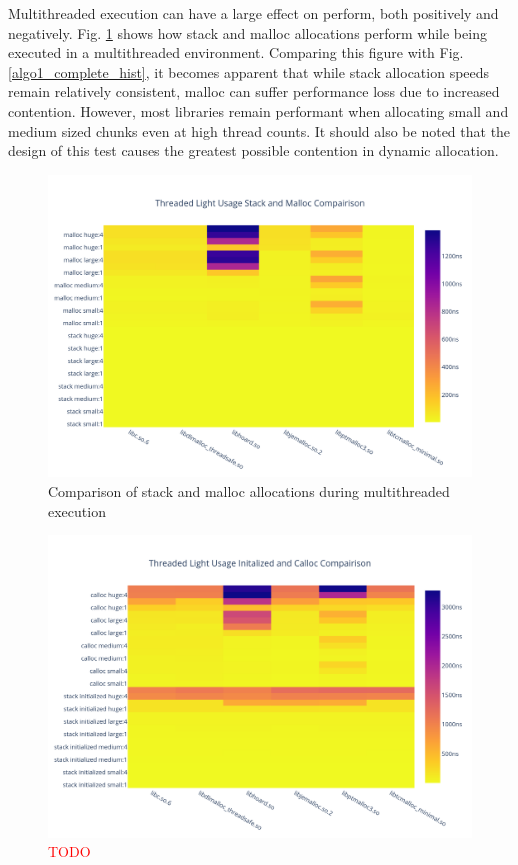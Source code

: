 \documentclass[letterpaper, 10 pt, conference]{ieeeconf}  %
\newcommand*\todo[0]{\textcolor{red}{TODO }}
\begin{document}
Multithreaded execution can have a large effect on perform, both positively and negatively.
Fig. \ref{algo1_stack_malloc_threaded_hist} shows how stack and malloc allocations perform while being executed in a multithreaded environment.
Comparing this figure with Fig. \ref{algo1_complete_hist}, it becomes apparent that while stack allocation speeds remain relatively consistent, malloc can suffer performance loss due to increased contention.
However, most libraries remain performant when allocating small and medium sized chunks even at high thread counts.
It should also be noted that the design of this test causes the greatest possible contention in dynamic allocation. 

\begin{figure}[tbh!]
  \centering
  \includegraphics[width=\columnwidth]{graphs/light_stack_malloc_threaded_hist.png}
  \caption{ Comparison of stack and malloc allocations during multithreaded execution }
  \label{algo1_stack_malloc_threaded_hist}
\end{figure}

\begin{figure}[tbh!]
  \centering
  \includegraphics[width=\columnwidth]{graphs/light_init_calloc_threaded_hist.png}
  \caption{ \todo }
  \label{algo1_init_calloc_threaded_hist}
\end{figure}
\end{document}
